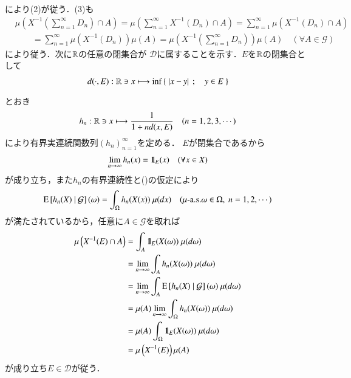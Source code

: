 \begin{prf}
\begin{description}
				により(2)が従う．(3)も
				\begin{align}
					&\mu\left( X^{-1}\left( \sum_{n=1}^{\infty} D_n \right) \cap A \right) 
					= \mu\left( \sum_{n=1}^{\infty} X^{-1}(D_n) \cap A \right) 
					= \sum_{n=1}^{\infty} \mu\left( X^{-1}(D_n) \cap A \right) \\
					&\qquad = \sum_{n=1}^{\infty} \mu\left( X^{-1}(D_n) \right) \mu(A) 
					= \mu\left( X^{-1}\left( \sum_{n=1}^{\infty} D_n \right) \right) \mu(A)\quad (\forall A \in \mathcal{G})
				\end{align}
				により従う．次に$\mathbb{R}$の任意の閉集合が
				$\mathscr{D}$に属することを示す．$E$を$\mathbb{R}$の閉集合として
				\begin{align}
					d(\cdot,E):\mathbb{R} \ni x \longmapsto \operatorname*{inf}_{} \left\{\ |x-y|\ \, ; \quad y \in E\ \right\}
				\end{align}
				とおき
				\begin{align}
					h_n:\mathbb{R} \ni x \longmapsto \frac{1}{1 + nd(x,E)} \quad (n=1,2,3,\cdots)
				\end{align}
				により有界実連続関数列$(h_n)_{n=1}^{\infty}$を定める．
				$E$が閉集合であるから
				\begin{align}
					\lim_{n \to \infty} h_n(x) = \mbox{1}\hspace{-0.25em}\mbox{l}_E(x)
					\quad (\forall x \in X)
				\end{align}
				が成り立ち，また$h_n$の有界連続性と()の仮定により
				\begin{align}
					\cexp{h_n(X)}{\mathcal{G}}(\omega) = \int_\Omega h_n(X(x))\ \mu(dx)
					\quad (\mbox{$\mu$-a.s.}\omega \in \Omega,\ n=1,2,\cdots)
				\end{align}
				が満たされているから，任意に$A \in \mathcal{G}$を取れば
				\begin{align}
					\mu\left( X^{-1}(E) \cap A \right) 
					&= \int_A \defunc_E(X(\omega))\ \mu(d\omega) \\
					&= \lim_{n \to \infty} \int_A h_n(X(\omega))\ \mu(d\omega) \\
					&= \lim_{n \to \infty} \int_A \cexp{h_n(X)}{\mathcal{G}}(\omega)\ \mu(d\omega) \\
					&= \mu(A)  \lim_{n \to \infty} \int_{\Omega} h_n(X(\omega))\ \mu(d\omega) \\
					&= \mu(A) \int_{\Omega} \defunc_E(X(\omega))\ \mu(d\omega) \\
					&= \mu\left( X^{-1}(E) \right) \mu(A)
				\end{align}
				が成り立ち$E \in \mathscr{D}$が従う．
			

\end{description}
\end{prf}
